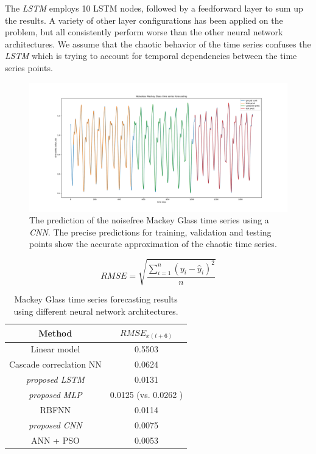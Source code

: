 \documentclass{article}
\begin{document}
The \emph{LSTM} employs 10 LSTM nodes, followed by a feedforward layer to sum up
the results. A variety of other layer configurations has been applied
on the problem,
but all consistently perform worse than the other neural network architectures.
We assume that the chaotic behavior of the time series confuses the \emph{LSTM}
which is trying to account for temporal dependencies between the time series
points.

\begin{figure}
  \centering
  \includegraphics[width=\linewidth]{figures/mg_pred_cnn.pdf}
  \caption{The prediction of the noisefree Mackey Glass time series using a
    \emph{CNN}. The precise predictions for training, validation and testing
    points show the accurate approximation of the chaotic time series.}
  \label{fig:mackey_pred}
\end{figure}

\begin{equation}
  RMSE = \sqrt{\frac{\sum_{i=1}^n (y_i - \hat{y}_i)^2}{n}}
  \label{equ:rmse}
\end{equation}

\begin{table}
  \centering
  \begin{tabular}{c|c}
    Method                         & $RMSE_{x(t+6)}$                          \\
    \hline
    Linear model                   & 0.5503                                   \\
    Cascade correclation NN        & 0.0624                                   \\
    \textit{proposed LSTM}         & 0.0131                                   \\
    \textit{proposed MLP}          & 0.0125 (vs. 0.0262 \cite{caraballo2016}) \\
    RBFNN                          & 0.0114                                   \\
    \textit{proposed CNN}          & 0.0075                                   \\
    ANN + PSO \cite{caraballo2016} & 0.0053                                   \\
  \end{tabular}
  \caption{Mackey Glass time series forecasting results using different neural
    network architectures.}
  \label{tab:mackey_results}
\end{table}
\end{document}
